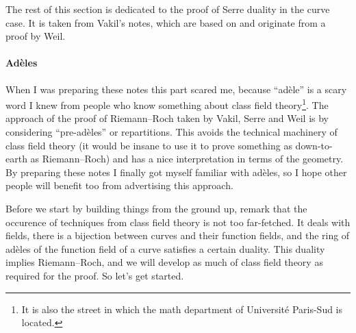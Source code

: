 \documentclass[10pt,a4paper]{article}
\theoremstyle{lecture}
\begin{document}
The rest of this section is dedicated to the proof of Serre duality in the curve case. It is taken from Vakil's notes, which are based on \cite{serre-groupes-algebriques-et-corps-de-classes} and originate from a proof by Weil.

\paragraph{Ad\`eles}
When I was preparing these notes this part scared me, because ``ad\`ele'' is a scary word I knew from people who know something about class field theory\footnote{It is also the street in which the math department of Universit\'e Paris-Sud is located.}. The approach of the proof of Riemann--Roch taken by Vakil, Serre and Weil is by considering ``pre-ad\`eles'' or repartitions. This avoids the technical machinery of class field theory (it would be insane to use it to prove something as down-to-earth as Riemann--Roch) and has a nice interpretation in terms of the geometry. By preparing these notes I finally got myself familiar with ad\`eles, so I hope other people will benefit too from advertising this approach.

Before we start by building things from the ground up, remark that the occurence of techniques from class field theory is not too far-fetched. It deals with fields, there is a bijection between curves and their function fields\addreference, and the ring of ad\`eles of the function field of a curve satisfies a certain duality\addreference. This duality implies Riemann--Roch, and we will develop as much of class field theory as required for the proof. So let's get started.
\end{document}
